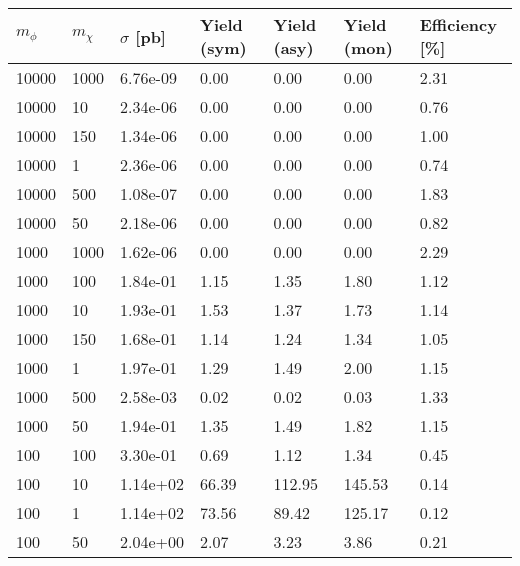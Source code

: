 \begin{table}
\footnotesize
\centering
\begin{tabular}{lllllll}
\hline
$m_\phi$ & $m_\chi$ & $\sigma$ [pb] & Yield (sym) & Yield (asy) & Yield (mon) & Efficiency [\%] \\ \hline
10000     &   1000      &   6.76e-09  &   0.00      &   0.00      &   0.00      &   2.31      \\ 
10000     &   10        &   2.34e-06  &   0.00      &   0.00      &   0.00      &   0.76      \\ 
10000     &   150       &   1.34e-06  &   0.00      &   0.00      &   0.00      &   1.00      \\ 
10000     &   1         &   2.36e-06  &   0.00      &   0.00      &   0.00      &   0.74      \\ 
10000     &   500       &   1.08e-07  &   0.00      &   0.00      &   0.00      &   1.83      \\ 
10000     &   50        &   2.18e-06  &   0.00      &   0.00      &   0.00      &   0.82      \\ 
1000      &   1000      &   1.62e-06  &   0.00      &   0.00      &   0.00      &   2.29      \\ 
1000      &   100       &   1.84e-01  &   1.15      &   1.35      &   1.80      &   1.12      \\ 
1000      &   10        &   1.93e-01  &   1.53      &   1.37      &   1.73      &   1.14      \\ 
1000      &   150       &   1.68e-01  &   1.14      &   1.24      &   1.34      &   1.05      \\ 
1000      &   1         &   1.97e-01  &   1.29      &   1.49      &   2.00      &   1.15      \\ 
1000      &   500       &   2.58e-03  &   0.02      &   0.02      &   0.03      &   1.33      \\ 
1000      &   50        &   1.94e-01  &   1.35      &   1.49      &   1.82      &   1.15      \\ 
100       &   100       &   3.30e-01  &   0.69      &   1.12      &   1.34      &   0.45      \\ 
100       &   10        &   1.14e+02  &   66.39     &   112.95    &   145.53    &   0.14      \\ 
100       &   1         &   1.14e+02  &   73.56     &   89.42     &   125.17    &   0.12      \\ 
100       &   50        &   2.04e+00  &   2.07      &   3.23      &   3.86      &   0.21      \\ 

\end{tabular}
\end{table}
